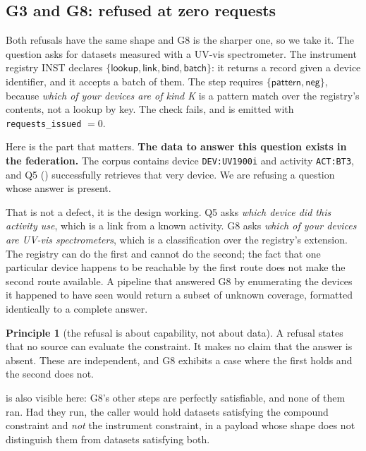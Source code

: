 \documentclass[11pt,a4paper]{article}
\theoremstyle{plain}
\theoremstyle{definition}
\newtheorem{principle}[theorem]{Principle}
\theoremstyle{remark}
\begin{document}
\subsection{G3 and G8: refused at zero requests}
\label{sec:g8}

Both refusals have the same shape and G8 is the sharper one, so we take
it. The question asks for datasets measured with a UV-vis
spectrometer. The instrument registry \textsf{INST} declares
$\{\textsf{lookup}, \textsf{link}, \textsf{bind}, \textsf{batch}\}$: it
returns a record given a device identifier, and it accepts a batch of
them. The step requires $\{\textsf{pattern}, \textsf{neg}\}$, because
\emph{which of your devices are of kind K} is a pattern match over the
registry's contents, not a lookup by key. The check fails, and
 is emitted with \texttt{requests\_issued} $= 0$.

Here is the part that matters. \textbf{The data to answer this question
exists in the federation.} The corpus contains device
\texttt{DEV:UV1900i} and activity \texttt{ACT:BT3}, and Q5
() successfully retrieves that very device. We are
refusing a question whose answer is present.

That is not a defect, it is the design working. Q5 asks \emph{which
device did this activity use}, which is a link from a known activity.
G8 asks \emph{which of your devices are UV-vis spectrometers}, which is
a classification over the registry's extension. The registry can do the
first and cannot do the second; the fact that one particular device
happens to be reachable by the first route does not make the second
route available. A pipeline that answered G8 by enumerating the devices
it happened to have seen would return a subset of unknown coverage,
formatted identically to a complete answer.

\begin{principle}[the refusal is about capability, not about data]
\label{prin:capnotdata}
A refusal states that no source can evaluate the constraint. It makes
no claim that the answer is absent. These are independent, and G8
exhibits a case where the first holds and the second does not.
\end{principle}

 is also visible here: G8's other steps are perfectly
satisfiable, and none of them ran. Had they run, the caller would hold
datasets satisfying the compound constraint and \emph{not} the
instrument constraint, in a payload whose shape does not distinguish
them from datasets satisfying both.
\end{document}
